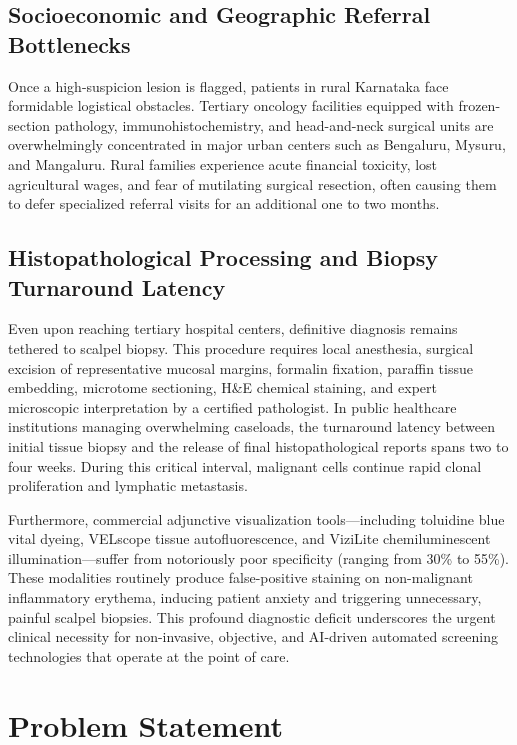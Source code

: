 \documentclass[12pt,a4paper,oneside]{report}
\begin{document}
\subsection{Socioeconomic and Geographic Referral Bottlenecks}
Once a high-suspicion lesion is flagged, patients in rural Karnataka face formidable logistical obstacles. Tertiary oncology facilities equipped with frozen-section pathology, immunohistochemistry, and head-and-neck surgical units are overwhelmingly concentrated in major urban centers such as Bengaluru, Mysuru, and Mangaluru. Rural families experience acute financial toxicity, lost agricultural wages, and fear of mutilating surgical resection, often causing them to defer specialized referral visits for an additional one to two months.

\subsection{Histopathological Processing and Biopsy Turnaround Latency}
Even upon reaching tertiary hospital centers, definitive diagnosis remains tethered to scalpel biopsy. This procedure requires local anesthesia, surgical excision of representative mucosal margins, formalin fixation, paraffin tissue embedding, microtome sectioning, H\&E chemical staining, and expert microscopic interpretation by a certified pathologist. In public healthcare institutions managing overwhelming caseloads, the turnaround latency between initial tissue biopsy and the release of final histopathological reports spans two to four weeks. During this critical interval, malignant cells continue rapid clonal proliferation and lymphatic metastasis.

Furthermore, commercial adjunctive visualization tools---including toluidine blue vital dyeing, VELscope tissue autofluorescence, and ViziLite chemiluminescent illumination---suffer from notoriously poor specificity (ranging from 30\% to 55\%). These modalities routinely produce false-positive staining on non-malignant inflammatory erythema, inducing patient anxiety and triggering unnecessary, painful scalpel biopsies. This profound diagnostic deficit underscores the urgent clinical necessity for non-invasive, objective, and AI-driven automated screening technologies that operate at the point of care.

\section{Problem Statement}
\label{sec:problem_statement}
\end{document}
